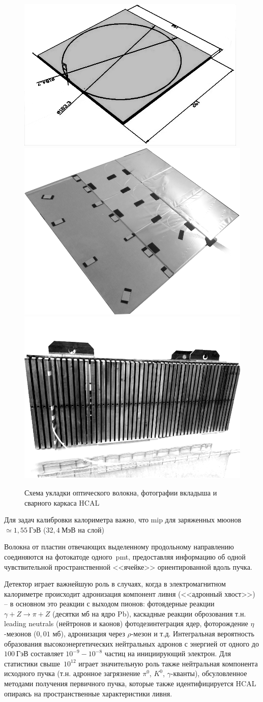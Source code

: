 
\begin{figure}
    \centering
    \includegraphics[width=0.3\linewidth]{images/hcal-cell-single-plastic-element.png}
    \includegraphics[width=0.3\linewidth]{images//illustrative/hcal-inlet-photo.png}
    \includegraphics[width=0.3\linewidth]{images//illustrative/hcal-frame-photo.png}
    \caption{Схема укладки оптического волокна, фотографии вкладыша и сварного каркаса HCAL~\cite{PolyakovHCALDrawings-na64site}}
    \label{fig:hcal-module}
\end{figure}

Для задач калибровки калориметра важно, что \acrshort{mip} для
заряженных мюонов $\simeq1{,}55~\text{ГэВ}$ ($32{,}4~\text{МэВ}$ на слой)

Волокна от пластин отвечающих выделенному продольному направлению
соединяются на фотокатоде одного~\acrshort{pmt}, предоставляя
информацию об одной чувствительной пространственной <<ячейке>>
ориентированной вдоль пучка.

Детектор играет важнейшую роль в случаях, когда в электромагнитном
калориметре происходит адронизация компонент
ливня (<<адронный хвост>>) -- в
основном это реакции с выходом пионов: фотоядерные
реакции~$\gamma + Z \rightarrow \pi + Z$ (десятки мб на ядро Pb),
каскадные реакции оброзования т.н. leading
neutrals \cite{leading-neutron-hera} (нейтронов и каонов)
фотодезинтеграция ядер, фоторождение $\eta$-мезонов ($0{,}01$ мб),
адронизация через $\rho$-мезон и т.д. Интегральная вероятность
образования высокоэнергетических нейтральных адронов с энергией
от одного до $100~\text{ГэВ}$ составляет $10^{-9}-10^{-8}$
частиц на инициирующий электрон. Для статистики
свыше~$10^{12}$ играет значительную роль также нейтральная компонента
исходного пучка (т.н. адронное
загрязнение $\pi^0$, $K^0$, $\gamma$-кванты), обсуловленное
методами получения первичного пучка, которые также
идентифицируется HCAL опираясь на пространственные
характеристики ливня.

